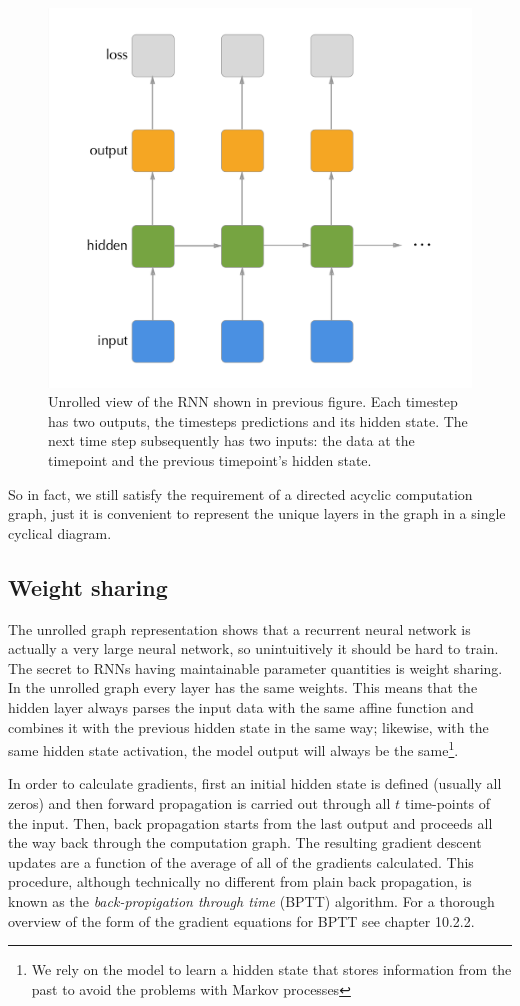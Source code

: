 \documentclass[]{book}
\let\rmarkdownfootnote\footnote%
\def\footnote{\protect\rmarkdownfootnote}
\theoremstyle{definition}
\theoremstyle{definition}
\theoremstyle{definition}
\theoremstyle{remark}
\begin{document}
\begin{figure}

{\centering \includegraphics[width=0.65\linewidth]{figures/rnn_unrolled} 

}

\caption{Unrolled view of the RNN shown in previous figure. Each timestep has two outputs, the timesteps predictions and its hidden state. The next time step subsequently has two inputs: the data at the timepoint and the previous timepoint's hidden state.}\label{fig:unrolledgraph}
\end{figure}

So in fact, we still satisfy the requirement of a directed acyclic
computation graph, just it is convenient to represent the unique layers
in the graph in a single cyclical diagram.

\subsection{Weight sharing}\label{weight-sharing}

The unrolled graph representation shows that a recurrent neural network
is actually a very large neural network, so unintuitively it should be
hard to train. The secret to RNNs having maintainable parameter
quantities is weight sharing. In the unrolled graph every layer has the
same weights. This means that the hidden layer always parses the input
data with the same affine function and combines it with the previous
hidden state in the same way; likewise, with the same hidden state
activation, the model output will always be the same\footnote{We rely on
  the model to learn a hidden state that stores information from the
  past to avoid the problems with Markov processes}.

In order to calculate gradients, first an initial hidden state is
defined (usually all zeros) and then forward propagation is carried out
through all \(t\) time-points of the input. Then, back propagation
starts from the last output and proceeds all the way back through the
computation graph. The resulting gradient descent updates are a function
of the average of all of the gradients calculated. This procedure,
although technically no different from plain back propagation, is known
as the \emph{back-propigation through time} (BPTT) algorithm. For a
thorough overview of the form of the gradient equations for BPTT see
\citet{goodfellow_DL} chapter 10.2.2.
\end{document}
